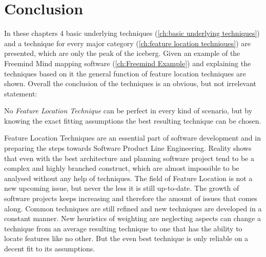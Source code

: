 \chapter{Conclusion}

In these chapters 4 basic underlying techniques (\autoref{ch:basic underlying techniques}) and a technique for every major category (\autoref{ch:feature location techniques}) are presented, which are only the peak of the iceberg. Given an example of the Freemind Mind mapping software (\autoref{ch:Freemind Example}) and explaining the techniques based on it the general function of feature location techniques are shown. Overall the conclusion of the techniques is an obvious, but not irrelevant statement: \newline
\begin{center}
	No \textit{Feature Location Technique} can be perfect in every kind of scenario, but by knowing the exact fitting assumptions the best resulting technique can be chosen.
\end{center} 

Feature Location Techniques are an essential part of software development and in preparing the steps towards Software Product Line Engineering. Reality shows that even with the best architecture and planning software project tend to be a complex and highly branched construct, which are almost impossible to be analysed without any help of techniques. \newline
The field of Feature Location is not a new upcoming issue, but never the less it is still up-to-date. The growth of software projects keeps increasing and therefore the amount of issues that comes along. Common techniques are still refined and new techniques are developed in a constant manner. New heuristics of weighting are neglecting aspects can change a technique from an average resulting technique to one that has the ability to locate features like no other. But the even best technique is only reliable on a decent fit to its assumptions. \newline



\cleardoublepage
